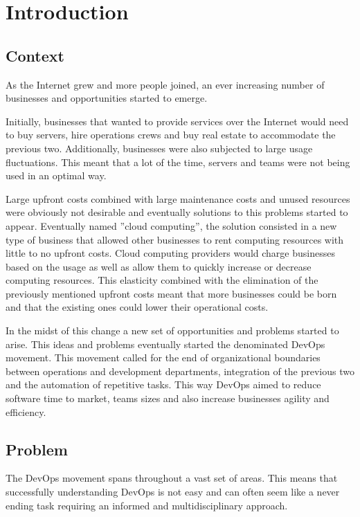 \chapter{Introduction} \label{chap:introduction}

	\section{Context} \label{chap:introduction:sec:context}

		As the Internet grew and more people joined, an ever increasing number of
	businesses and opportunities started to emerge.
		
	    Initially, businesses that wanted to provide services over the Internet would need to buy servers, hire operations crews and buy real estate to accommodate the previous two. Additionally, businesses were also subjected to large usage fluctuations. This meant that a lot of the time, servers and teams were not being used in an optimal way. 
	    
	    Large upfront costs combined with large maintenance costs and unused resources were obviously not desirable and eventually solutions to this problems started to appear. Eventually named ”cloud computing”, the solution consisted in a new type of business that allowed other businesses to rent computing resources with little to no upfront costs. Cloud computing providers would charge businesses based on the usage as well as allow them to quickly increase or decrease computing resources. This elasticity combined with the elimination of the previously mentioned upfront costs meant that more businesses could be born and that the existing ones could lower their operational costs.

		In the midst of this change a new set of opportunities and problems started to arise. This ideas and problems eventually started the denominated DevOps movement. This movement called for the end of organizational boundaries between operations and development departments, integration of the previous two and the automation of repetitive tasks. This way DevOps aimed to reduce software time to market, teams sizes and also increase businesses agility and efficiency.	

	\section{Problem} \label{chap:introduction:sec:problem}

		The DevOps movement spans throughout a vast set of areas. This means that successfully understanding DevOps is not easy and can often seem like a never ending task requiring an informed and multidisciplinary approach.

